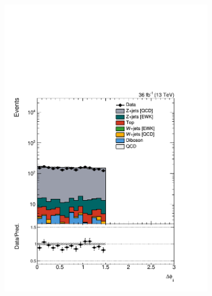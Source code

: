 \begin{figure}[]
\begin{center}
\begin{subfigure}[t]{0.24\textwidth}
            \includegraphics[width=\textwidth]{figures/vbf/prefit/dielectron_jot12DPhi_logy.pdf}
        \end{subfigure}
        \begin{subfigure}[t]{0.24\textwidth}

\end{subfigure}
\end{center}
\end{figure}
